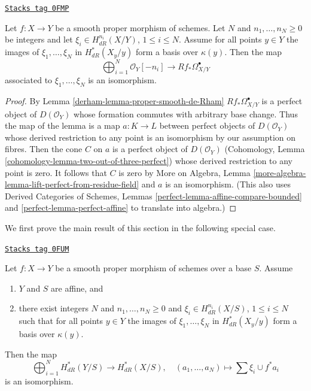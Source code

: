 \begin{lemma}
\label{derham-lemma-relative-global-generation-on-fibres}
\href{https://stacks.math.columbia.edu/tag/0FMP}{\texttt{Stacks tag 0FMP}}

Let $f : X \to Y$ be a smooth proper morphism of schemes.
Let $N$ and $n_1, \ldots, n_N \geq 0$ be integers and let
$\xi_i \in H^{n_i}_{dR}(X/Y)$, $1 \leq i \leq N$.
Assume for all points $y \in Y$ the images of $\xi_1, \ldots, \xi_N$
in $H^*_{dR}(X_y/y)$ form a basis over $\kappa(y)$. Then the map
$$
\bigoplus\nolimits_{i = 1}^N \mathcal{O}_Y[-n_i]
\longrightarrow
Rf_*\Omega^\bullet_{X/Y}
$$
associated to $\xi_1, \ldots, \xi_N$ is an isomorphism.
\end{lemma}

\begin{proof}

By Lemma \ref{derham-lemma-proper-smooth-de-Rham}
$Rf_*\Omega^\bullet_{X/Y}$ is a perfect object of $D(\mathcal{O}_Y)$
whose formation commutes with arbitrary base change.
Thus the map of the lemma is a map $a : K \to L$
between perfect objects of $D(\mathcal{O}_Y)$
whose derived restriction to any point is an isomorphism
by our assumption on fibres. Then the cone $C$ on $a$ is a perfect
object of $D(\mathcal{O}_Y)$ (Cohomology, Lemma
\ref{cohomology-lemma-two-out-of-three-perfect}) whose
derived restriction to any point is zero. It follows that $C$
is zero by More on Algebra, Lemma
\ref{more-algebra-lemma-lift-perfect-from-residue-field}
and $a$ is an isomorphism. (This also uses Derived Categories of Schemes,
Lemmas \ref{perfect-lemma-affine-compare-bounded} and
\ref{perfect-lemma-perfect-affine} to translate into algebra.)
\end{proof}

We first prove the main result of this section in the
following special case.

\begin{lemma}
\label{derham-lemma-global-generation-on-fibres}
\href{https://stacks.math.columbia.edu/tag/0FUM}{\texttt{Stacks tag 0FUM}}

Let $f : X \to Y$ be a smooth proper morphism of schemes over a base $S$.
Assume
\begin{enumerate}
\item $Y$ and $S$ are affine, and
\item there exist integers $N$ and $n_1, \ldots, n_N \geq 0$ and
$\xi_i \in H^{n_i}_{dR}(X/S)$, $1 \leq i \leq N$ such that
for all points $y \in Y$ the images of $\xi_1, \ldots, \xi_N$
in $H^*_{dR}(X_y/y)$ form a basis over $\kappa(y)$.
\end{enumerate}
Then the map
$$
\bigoplus\nolimits_{i = 1}^N H^*_{dR}(Y/S) \longrightarrow
H^*_{dR}(X/S), \quad
(a_1, \ldots, a_N) \longmapsto  \sum \xi_i \cup f^*a_i
$$
is an isomorphism.
\end{lemma}


